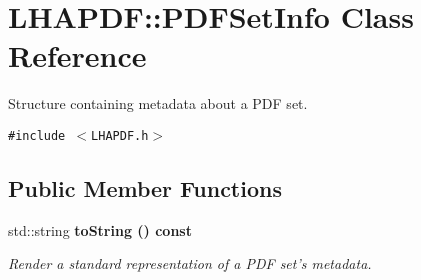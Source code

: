 \section{LHAPDF::PDFSet\-Info Class Reference}
\label{classLHAPDF_1_1PDFSetInfo}
Structure containing metadata about a PDF set.  


{\tt \#include $<$LHAPDF.h$>$}

\subsection*{Public Member Functions}
\begin{CompactItemize}
\item 
std::string \bf{to\-String} () const \label{classLHAPDF_1_1PDFSetInfo_50bd9e2756d6b7919dab49b29c23023b}

\begin{CompactList}\small\item\em Render a standard representation of a PDF set's metadata. \item\end{CompactList}\end{CompactItemize}
